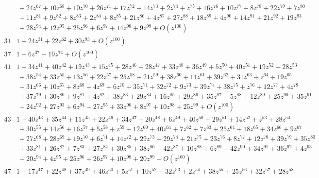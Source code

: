 \documentclass[11pt,leqno]{article}
\theoremstyle{remark}
\theoremstyle{definition}
\begin{document}
\begin{table}
\begin{equation*}
\begin{array}{|c|l|}
&~+ 24 z^{67} + 10 z^{68} + 10 z^{70} + 26 z^{71} + 17 z^{72} + 14 z^{73} + 2 z^{74} +  z^{75} + 16 z^{76} + 10 z^{77} + 8 z^{78} + 22 z^{79} + 7 z^{80}\\
&~+ 11 z^{81} + 9 z^{82} + 8 z^{83} + 2 z^{84} + 8 z^{85} + 21 z^{86} + 4 z^{87} + 27 z^{88} + 18 z^{89} + 4 z^{90} + 14 z^{91} + 21 z^{92} + 19 z^{93}\\
&~ + 28 z^{94} + 12 z^{95} + 25 z^{96} + 6 z^{97} + 14 z^{98} + 9 z^{99} + O(z^{100}) \\[4pt]
31 & 1 + 24 z^{31} + 22 z^{62} + 30 z^{93} + O(z^{100}) \\[4pt]
37 & 1 + 6 z^{37} + 19 z^{74} + O(z^{100}) \\[4pt]
41 & 1 + 34 z^{41} + 40 z^{42} + 19 z^{43} + 15 z^{45} + 28 z^{46} + 28 z^{47} + 33 z^{48} + 36 z^{49} + 5 z^{50} + 40 z^{51} + 19 z^{52} + 28 z^{53}\\
& ~+ 38 z^{54} + 33 z^{55} + 13 z^{56} + 22 z^{57} + 25 z^{58} + 21 z^{59} + 38 z^{60} + 11 z^{61} + 39 z^{62} + 31 z^{63} +  z^{64} + 19 z^{65}\\
&~ + 31 z^{66} + 10 z^{67} + 8 z^{68} + 4 z^{69} + 6 z^{70} + 35 z^{71} + 32 z^{72} + 9 z^{73} + 39 z^{74} + 38 z^{75} +  z^{76} + 12 z^{77} + 4 z^{78}\\
&~+ 37 z^{79} + 30 z^{80} + 9 z^{81} + 4 z^{82} + 38 z^{83} + 29 z^{84} + 16 z^{85} + 29 z^{86} + 35 z^{87} + 5 z^{88} + 12 z^{89} + 25 z^{90} + 35 z^{91}\\
&~ + 24 z^{92} + 27 z^{93} + 6 z^{94} + 27 z^{95} + 33 z^{96} + 8 z^{97} + 10 z^{98} + 25 z^{99} + O(z^{100}) \\[4pt]
43 & 1 + 40 z^{43} + 35 z^{44} + 11 z^{45} + 22 z^{46} + 34 z^{47} + 20 z^{48} + 6 z^{49} + 40 z^{50} + 29 z^{51} + 14 z^{52} +  z^{53} + 28 z^{54}\\
&~+ 30 z^{55} + 14 z^{56} + 16 z^{57} + 5 z^{58} +  z^{59} + 12 z^{60} + 40 z^{61} + 7 z^{62} + 7 z^{63} + 25 z^{64} + 18 z^{65} + 34 z^{66} + 9 z^{67}\\
&~+ 27 z^{68} + 28 z^{69} + 19 z^{70} + 6 z^{71} + 14 z^{72} + 29 z^{73} + 29 z^{74} + 21 z^{75} + 23 z^{76} + 8 z^{77} + 12 z^{78} + 39 z^{79} + 35 z^{80}\\
&~+ 33 z^{81} + 26 z^{82} + 7 z^{83} + 27 z^{84} + 30 z^{85} + 38 z^{86} + 42 z^{87} + 10 z^{88} + 6 z^{89} + 42 z^{90} + 34 z^{91}+ 36 z^{92} + 4 z^{93}\\
&~+ 20 z^{94} + 4 z^{95} + 25 z^{96} + 26 z^{97} + 10 z^{98} + 20 z^{99} + O(z^{100}) \\[4pt]
47 & 1 + 17 z^{47} + 22 z^{48} + 37 z^{49} + 46 z^{50} + 5 z^{51} + 10 z^{52} + 32 z^{53} + 2 z^{54} + 38 z^{55} + 25 z^{56} + 32 z^{57} + 28 z^{58}\\

\end{array}
\end{equation*}
\end{table}
\end{document}
